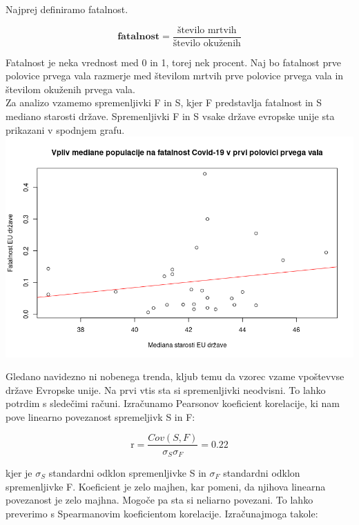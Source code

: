 \documentclass[a4paper,11pt]{article}
\begin{document}
Najprej definiramo fatalnost.
\begin{center}
\[\textbf{fatalnost} = \frac{\text{število mrtvih}}{\text{število okuženih}}\]
\end{center} 
Fatalnost je neka vrednost med 0 in 1, torej nek procent. Naj bo fatalnost prve polovice prvega vala razmerje med številom mrtvih prve polovice prvega vala in številom okuženih prvega vala. \\
Za analizo vzamemo spremenljivki F in S, kjer F predstavlja fatalnost in S mediano starosti države. Spremenljivki F in S vsake države evropske unije sta prikazani v spodnjem grafu.
\includegraphics[scale=0.55]{Vpliv_mediane_populacije_na_fatalnost_Covid-19_v_prvi_polovici_vala}

Gledano navidezno ni nobenega trenda, kljub temu da vzorec vzame vpoštevvse države Evropske unije. Na prvi vtis sta si spremenljivki neodvisni. To lahko potrdim s sledečimi računi. Izračunamo Pearsonov koeficient korelacije, ki nam pove linearno povezanost spremeljivk S in F:

\begin{center}
\[\text{r} = \frac{Cov(S,F)}{\sigma_{S} \sigma_{F}} = 0.22\]
\end{center} 
kjer je \(\sigma_{S}\) standardni odklon spremenljivke S in \(\sigma_{F}\) standardni odklon spremenljivke F. Koeficient je zelo majhen, kar pomeni, da njihova linearna povezanost je zelo majhna. Mogoče pa sta si neliarno povezani. To lahko preverimo s Spearmanovim koeficientom korelacije. Izračunajmoga takole: 
\end{document}
